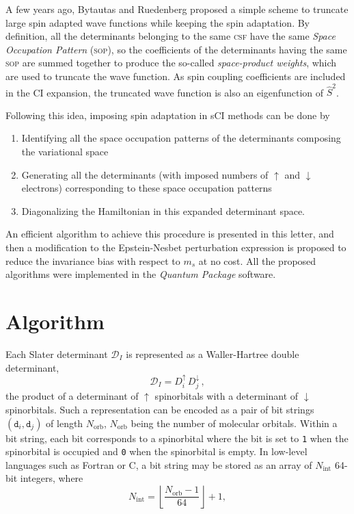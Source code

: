 \documentclass[aip,jcp,reprint,showkeys]{revtex4-1}
\newcommand{\stwo}{\hat{S}^2}
\newcommand{\md}{\mathtt{d}}
\newcommand{\mD}{\mathcal{D}}
\newcommand{\up}{\uparrow}
\newcommand{\dn}{\downarrow}
\newcommand{\Nint}{{N_\text{int}}}
\newcommand{\Norb}{{N_\text{orb}}}
\newcommand{\one}{{\texttt{1}}}
\newcommand{\zero}{{\texttt{0}}}
\newcommand{\sop}{\textsc{sop}}
\newcommand{\csf}{\textsc{csf}}
\begin{document}
A few years ago, Bytautas and Ruedenberg proposed a simple scheme to truncate
large spin adapted wave functions while keeping the spin
adaptation.\cite{Bytautas_2007}
By definition, all the determinants belonging to the same {\csf} have the same
\emph{Space Occupation Pattern} (\sop), so the
coefficients of the determinants having the same {\sop}
are summed together to produce the so-called \emph{space-product
weights}, which are used to truncate the wave function. As spin coupling
coefficients are included in the CI expansion, the truncated wave function is
also an eigenfunction of $\stwo$.

Following this idea, imposing spin adaptation in sCI methods can be done by 
\begin{enumerate}
\item Identifying all the space occupation patterns of the determinants composing
      the variational space
\item Generating all the determinants (with imposed numbers of $\up$ and
      $\dn$ electrons) corresponding to these space occupation patterns
\item Diagonalizing the Hamiltonian in this expanded determinant space.
\end{enumerate}
An efficient algorithm to achieve this procedure is presented in this letter,
and then a modification to the Epstein-Nesbet perturbation expression is
proposed to reduce the invariance bias with respect to $m_s$ at no cost.
All the proposed algorithms were implemented in the \emph{Quantum Package}
software.\cite{qp}


\section{Algorithm}

Each Slater determinant $\mD_I$ is represented as a Waller-Hartree double
determinant,\cite{Pauncz_1989}
\begin{equation}
 \label{eq:di}
 \mD_I = D_i^\up \, D_j^\dn\, ,
\end{equation}
the product of a determinant of
$\up$ spinorbitals with a determinant of $\dn$ spinorbitals.
Such a representation can be encoded as a pair of bit strings $(\md_i,\md_j)$ of length $\Norb$,  $\Norb$ being the number of molecular orbitals.
Within a bit string, each bit corresponds to a spinorbital where the bit is set to \one{} when the
spinorbital is occupied and \zero{} when the spinorbital is empty. In low-level languages such as Fortran or C, a bit
string may be stored as an array of $\Nint$ 64-bit integers, where 
\begin{equation}
  \Nint = \left \lfloor \frac{\Norb-1}{64} \right \rfloor + 1,
\end{equation}
\end{document}
